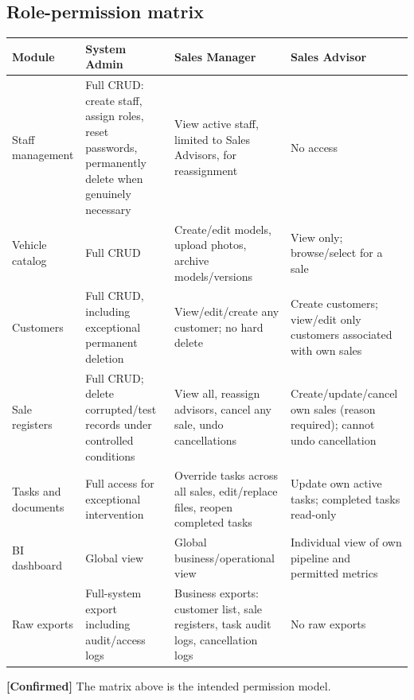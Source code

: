 \documentclass[11pt,a4paper]{article}
\newcommand{\tagconf}{\textcolor{green!45!black}{\textbf{[Confirmed]}}}
\begin{document}
\subsection{Role-permission matrix}

\begin{longtable}{@{}L{2.6cm}L{4.5cm}L{4.4cm}L{4.3cm}@{}}
	\toprule
	\textbf{Module}                                                    &
	\textbf{System Admin}
	                                                                   &
	\textbf{Sales Manager}                                             &
	\textbf{Sales
		Advisor}
	\\
	\midrule
	\endhead
	Staff management                                                   & Full
	CRUD:
	create staff, assign roles, reset passwords, permanently delete when genuinely
	necessary                                                          & View
	active staff, limited to Sales Advisors, for reassignment
	                                                                   & No access
	\\
	Vehicle catalog                                                    & Full CRUD
	                                                                   &
	Create/edit models, upload photos, archive models/versions         & View only;
	browse/select for a sale
	\\
	Customers                                                          & Full
	CRUD,
	including exceptional permanent deletion
	                                                                   &
	View/edit/create any customer; no hard delete                      & Create
	customers; view/edit only
	customers associated with own sales
	\\
	Sale registers                                                     & Full
	CRUD;
	delete corrupted/test records under controlled conditions
	                                                                   & View all,
	reassign advisors, cancel any sale, undo cancellations             &
	Create/update/cancel own sales (reason required); cannot undo cancellation
	\\
	Tasks and documents                                                & Full
	access for exceptional intervention
	                                                                   & Override
	tasks across all sales, edit/replace files, reopen completed tasks &
	Update own active tasks; completed tasks read-only
	\\
	BI dashboard                                                       & Global
	view                                                               & Global
	business/operational view
	                                                                   &
	Individual view
	of own pipeline and permitted metrics
	\\
	Raw exports                                                        &
	Full-system export including audit/access logs                     & Business
	exports:
	customer list, sale registers, task audit logs, cancellation logs  & No raw
	exports
	\\
	\bottomrule
\end{longtable}
\tagconf{} The matrix above is the intended permission model.
\end{document}
